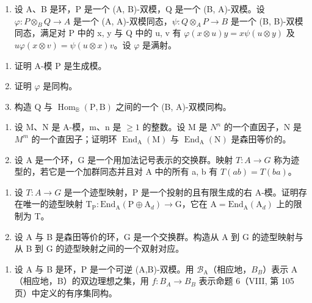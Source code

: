 
\begin{enumerate}
\def\labelenumi{\arabic{enumi})}
\tightlist
\item
  设 A、B 是环，P 是一个 (A, B)-双模，Q 是一个 (B, A)-双模。设 \(\varphi: P \otimes_{B} Q \to A\) 是一个 (A, A)-双模同态，\(\psi: Q \otimes_{A} P \to B\) 是一个 (B, B)-双模同态，满足对 P 中的 x, y 与 Q 中的 u, v 有 \(\varphi(x \otimes u)y = x\psi(u \otimes y)\) 及 \(u\varphi(x \otimes v) = \psi(u \otimes x)v\)。设 \(\varphi\) 是满射。
\end{enumerate}

\begin{enumerate}
\def\labelenumi{\alph{enumi})}
\item
  证明 A-模 P 是生成模。
\item
  证明 \(\varphi\) 是同构。
\item
  构造 Q 与 \(\operatorname{Hom}_{\mathbb{B}}(\mathrm{P}, \mathrm{B})\) 之间的一个 (B, A)-双模同构。
\end{enumerate}

\begin{enumerate}
\def\labelenumi{\arabic{enumi})}
\setcounter{enumi}{1}
\item
  设 M、N 是 A-模，m、n 是 \(\geqslant 1\) 的整数。设 M 是 \(N^{n}\) 的一个直因子，N 是 \(M^{m}\) 的一个直因子；证明环 \(\operatorname{End}_{\mathrm{A}}(\mathrm{M})\) 与 \(\operatorname{End}_{\mathrm{A}}(\mathrm{N})\) 是森田等价的。
\item
  设 A 是一个环，G 是一个用加法记号表示的交换群。映射 \(T: A \to G\) 称为迹型的，若它是一个加群同态并且对 A 中的所有 a, b 有 \(T(ab) = T(ba)\)。
\end{enumerate}

\begin{enumerate}
\def\labelenumi{\alph{enumi})}
\item
  设 \(T : A \to G\) 是一个迹型映射，P 是一个投射的且有限生成的右 A-模。证明存在唯一的迹型映射 \(\mathrm{T}_{\mathrm{P}} : \mathrm{End}_{\mathrm{A}}(\mathrm{P} \oplus \mathrm{A}_{d}) \to \mathrm{G}\)，它在 \(\mathrm{A} = \mathrm{End}_{\mathrm{A}}(\mathrm{A}_{d})\) 上的限制为 T。
\item
  设 A 与 B 是森田等价的环，G 是一个交换群。构造从 A 到 G 的迹型映射与从 B 到 G 的迹型映射之间的一个双射对应。
\end{enumerate}

\begin{enumerate}
\def\labelenumi{\arabic{enumi})}
\setcounter{enumi}{3}
\tightlist
\item
  设 A 与 B 是环，P 是一个可逆 (A,B)-双模。用 \(\mathcal{B}_{\mathrm{A}}\)（相应地，\(B_{B}\)）表示 A（相应地，B）的双边理想之集，用 \(f: B_{A} \to B_{B}\) 表示命题 6（VIII, 第 105 页）中定义的有序集同构。
\end{enumerate}

